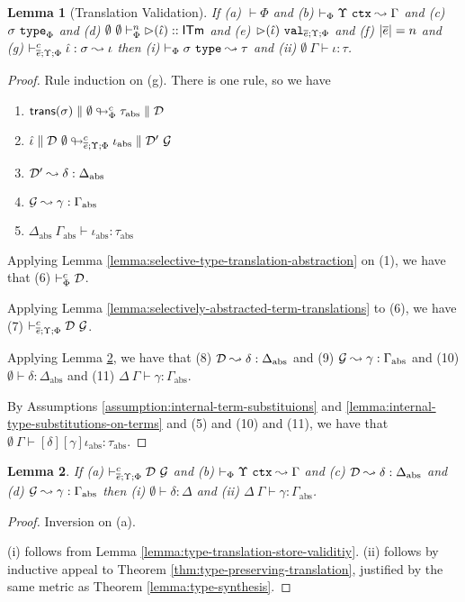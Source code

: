 \documentclass[12pt]{article}
\newtheorem{lemma}{Lemma}
\begin{document}
\begin{lemma}[Translation Validation]
\label{lemma:translation-validation}
If (a) $\vdash \Phi$ and (b) $\vdash_{\Phi} \Upsilon~\mathtt{ctx} \leadsto \Gamma$ and (c) $\sigma~\mathtt{type}_{\Phi}$ and (d) $\emptyset~\emptyset \vdash_{\Phi}^{n} {\rhd}(\hat{\iota}) :: {\sf ITm}$ and (e) ${\rhd}(\hat{\iota})~\mathtt{val}_{\overline{e};\Upsilon;\Phi}$ and (f) $|\overline{e}|=n$ and (g) $\vdash_{\overline{e};\Upsilon;\Phi}^c \hat{\iota} : \sigma \leadsto \iota$ then (i) $\vdash_{\Phi} \sigma~\mathtt{type} \leadsto \tau$ and (ii) $\emptyset~\Gamma \vdash \iota : \tau$.
\end{lemma}
\begin{proof}
    Rule induction on (g). There is one rule, so we have \begin{enumerate}[(1)]
        \item ${\sf trans}(\sigma) \parallel \emptyset \looparrowright_{\Phi}^{c} \tau_\text{abs} \parallel \mathcal{D}$
        \item $\hat{\iota} \parallel \mathcal{D}~\emptyset \looparrowright^{c}_{{\overline{e};\Upsilon;\Phi}} \iota_\text{abs} \parallel \mathcal{D}'~\mathcal{G}$
        \item $\mathcal{D}' \leadsto \delta : \Delta_\text{abs}$
        \item $\mathcal{G} \leadsto \gamma : \Gamma_\text{abs}$
        \item $\Delta_\text{abs}~\Gamma_\text{abs} \vdash \iota_\text{abs} : \tau_\text{abs}$
    \end{enumerate}

    Applying Lemma \ref{lemma:selective-type-translation-abstraction} on (1), we have that (6) $\vdash_{\Phi}^{c} \mathcal{D}$.

    Applying Lemma \ref{lemma:selectively-abstracted-term-translations} to (6), we have (7) $\vdash_{\overline{e}; \Upsilon; \Phi}^{c} \mathcal{D}~\mathcal{G}$.

    Applying Lemma \ref{lemma:BINGO}, we have that (8) $\mathcal{D} \leadsto \delta : \Delta_\text{abs}$ and (9) $\mathcal{G} \leadsto \gamma : \Gamma_\text{abs}$ and (10) $\emptyset \vdash \delta : \Delta_\text{abs}$ and (11) $\Delta~\Gamma \vdash \gamma : \Gamma_\text{abs}$.

    By Assumptions \ref{assumption:internal-term-substituions} and \ref{lemma:internal-type-substitutions-on-terms} and (5) and (10) and (11), we have that $\emptyset~\Gamma \vdash [\delta][\gamma]\iota_\text{abs} : \tau_\text{abs}$.
\end{proof}

\begin{lemma}
\label{lemma:BINGO}
    If (a) $\vdash_{\overline{e}; \Upsilon; \Phi}^{c} \mathcal{D}~\mathcal{G}$ and (b) $\vdash_{\Phi} \Upsilon~\mathtt{ctx} \leadsto \Gamma$ and (c) $\mathcal{D} \leadsto \delta : \Delta_\text{abs}$ and (d) $\mathcal{G} \leadsto \gamma : \Gamma_\text{abs}$ then (i) $\emptyset \vdash \delta : \Delta$ and (ii) $\Delta~\Gamma \vdash \gamma : \Gamma_\text{abs}$.
\end{lemma}\begin{proof} Inversion on (a).

    (i) follows from Lemma \ref{lemma:type-translation-store-validitiy}.
    (ii) follows by inductive appeal to Theorem \ref{thm:type-preserving-translation}, justified by the same metric as Theorem \ref{lemma:type-synthesis}.
\end{proof}
\end{document}
